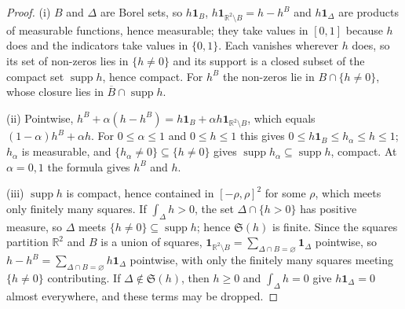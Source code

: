 \documentclass[11pt,a4paper]{article}
\theoremstyle{plain}
\theoremstyle{definition}
\theoremstyle{plain}
\theoremstyle{definition}
\newcommand{\R}{\mathbb{R}}
\DeclareMathOperator{\supp}{supp}
\begin{document}
\begin{proof}
(i) $B$ and $\Delta$ are Borel sets, so $h\mathbf 1_B$, $h\mathbf 1_{\R^2\setminus B}=h-h^B$
and $h\mathbf 1_\Delta$ are products of measurable functions, hence measurable; they take
values in $[0,1]$ because $h$ does and the indicators take values in $\{0,1\}$.  Each
vanishes wherever $h$ does, so its set of non-zeros lies in $\{h\ne0\}$ and its support is
a closed subset of the compact set $\supp h$, hence compact.  For $h^B$ the non-zeros lie in
$B\cap\{h\ne0\}$, whose closure lies in $\overline B\cap\supp h$.

(ii) Pointwise, $h^B+\alpha(h-h^B)=h\mathbf 1_B+\alpha h\mathbf 1_{\R^2\setminus B}$, which
equals $(1-\alpha)h^B+\alpha h$.  For $0\le\alpha\le1$ and $0\le h\le1$ this gives $0\le
h\mathbf 1_B\le h_\alpha\le h\le1$; $h_\alpha$ is measurable, and $\{h_\alpha\ne0\}\subseteq
\{h\ne0\}$ gives $\supp h_\alpha\subseteq\supp h$, compact.  At $\alpha=0,1$ the formula
gives $h^B$ and $h$.

(iii) $\supp h$ is compact, hence contained in $[-\rho,\rho]^2$ for some $\rho$, which meets
only finitely many squares.  If $\int_\Delta h>0$, the set $\Delta\cap\{h>0\}$ has positive
measure, so $\Delta$ meets $\{h\ne0\}\subseteq\supp h$; hence $\mathfrak S(h)$ is finite.
Since the squares partition $\R^2$ and $B$ is a union of squares, $\mathbf 1_{\R^2\setminus
B}=\sum_{\Delta\cap B=\varnothing}\mathbf 1_\Delta$ pointwise, so $h-h^B=\sum_{\Delta\cap
B=\varnothing}h\mathbf 1_\Delta$ pointwise, with only the finitely many squares meeting
$\{h\ne0\}$ contributing.  If $\Delta\notin\mathfrak S(h)$, then $h\ge0$ and $\int_\Delta
h=0$ give $h\mathbf 1_\Delta=0$ almost everywhere, and these terms may be dropped.


\end{proof}
\end{document}

